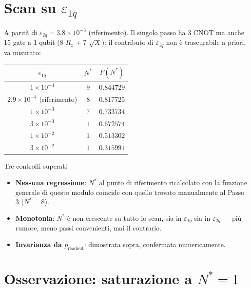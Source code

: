 \documentclass[11pt,a4paper]{article}
\begin{document}
\section*{Scan su $\varepsilon_{1q}$}

A parità di $\varepsilon_{2q}=3.8\times10^{-3}$ (riferimento). Il singolo
passo ha 3 CNOT ma anche 15 gate a 1 qubit (8 $R_z$ + 7 $\sqrt X$): il
contributo di $\varepsilon_{1q}$ non è trascurabile a priori, va misurato:

\begin{center}
\renewcommand{\arraystretch}{1.2}
\begin{tabular}{@{}ccc@{}}
\toprule
$\varepsilon_{1q}$ & $N^*$ & $F(N^*)$ \\
\midrule
$1\times10^{-4}$ & $9$ & $0.844729$ \\
$2.9\times10^{-4}$ (riferimento) & $8$ & $0.817725$ \\
$1\times10^{-3}$ & $7$ & $0.733734$ \\
$3\times10^{-3}$ & $1$ & $0.672574$ \\
$1\times10^{-2}$ & $1$ & $0.513302$ \\
$3\times10^{-2}$ & $1$ & $0.315991$ \\
\bottomrule
\end{tabular}
\end{center}

\begin{okbox}{Tre controlli superati}
\begin{itemize}[leftmargin=1.2em,itemsep=0.2em]
\item \textbf{Nessuna regressione}: $N^*$ al punto di riferimento
ricalcolato con la funzione generale di questo modulo coincide con quello
trovato manualmente al Passo 3 ($N^*=8$).
\item \textbf{Monotonia}: $N^*$ è non-crescente su tutto lo scan, sia in
$\varepsilon_{1q}$ sia in $\varepsilon_{2q}$ --- più rumore, meno passi
convenienti, mai il contrario.
\item \textbf{Invarianza da $p_\text{readout}$}: dimostrata sopra,
confermata numericamente.
\end{itemize}
\end{okbox}

\section*{Osservazione: saturazione a $N^*=1$}
\end{document}
